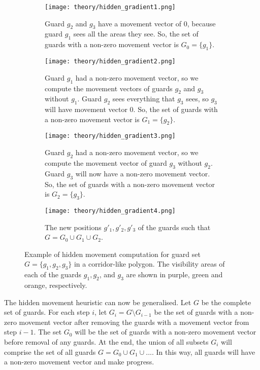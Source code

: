 \begin{figure}[h!]
    \centering
    \begin{subfigure}{0.45\textwidth}
        \texttt{[image: theory/hidden\_gradient1.png]}
        \caption{Guard $g_2$ and $g_3$ have a movement vector of 0, because guard $g_1$ sees all the areas they see. So, the set of guards with a non-zero movement vector is $G_0 = \{g_1\}$.}
        \label{fig:hidden_gradient1}
    \end{subfigure}
    \hfill
    \begin{subfigure}{0.45\textwidth}
        \texttt{[image: theory/hidden\_gradient2.png]}
        \caption{Guard $g_1$ had a non-zero movement vector, so we compute the movement vectors of guards $g_2$ and $g_3$ without $g_1$. Guard $g_2$ sees everything that $g_3$ sees, so $g_3$ will have movement vector 0. So, the set of guards with a non-zero movement vector is $G_1 = \{g_2\}$.}
        \label{fig:hidden_gradient2}
    \end{subfigure}
    \begin{subfigure}{0.45\textwidth}
        \texttt{[image: theory/hidden\_gradient3.png]}
        \caption{Guard $g_2$ had a non-zero movement vector, so we compute the movement vector of guard $g_3$ without $g_2$. Guard $g_3$ will now have a non-zero movement vector. So, the set of guards with a non-zero movement vector is $G_2 = \{g_3\}$.}
        \label{fig:hidden_gradient3}
    \end{subfigure}
    \hfill
    \begin{subfigure}{0.45\textwidth}
        \texttt{[image: theory/hidden\_gradient4.png]}
        \caption{The new positions $g'_1, g'_2, g'_3$ of the guards such that $G = G_0 \cup G_1 \cup G_2$.}
        \label{fig:hidden_gradient4}
    \end{subfigure}
    \caption{Example of hidden movement computation for guard set $G = \{g_1, g_2, g_3\}$ in a corridor-like polygon. The visibility areas of each of the guards $g_1, g_2$, and $g_3$ are shown in purple, green and orange, respectively.}
    \label{fig:hidden_gradient}
\end{figure}

The hidden movement heuristic can now be generalised. Let $G$ be the complete set of guards. For each step $i$, let $G_i = G \setminus G_{i - 1}$ be the set of guards with a non-zero movement vector after removing the guards with a movement vector from step $i - 1$. The set $G_0$ will be the set of guards with a non-zero movement vector before removal of any guards. At the end, the union of all subsets $G_i$ will comprise the set of all guards $G = G_0 \cup G_1 \cup ...$.
In this way, all guards will have a non-zero movement vector and make progress.

